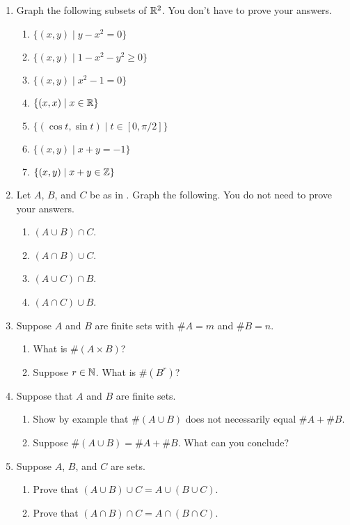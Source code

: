 \begin{enumerate}
    \item Graph the following subsets of $\mathbb{R}^2$. You don't have to prove your answers.
  \begin{enumerate}
      \item $\{(x, y) \mid y - x^2 = 0\}$
      \item $\{(x, y) \mid 1 - x^2 - y^2 \geq 0\}$
      \item $\{(x, y) \mid x^2 - 1 = 0\}$
      \item $\{(x, x) \mid x \in \mathbb{R}\}$
      \item $\{(\cos t, \sin t) \mid t \in [0, \pi/2]\}$
      \item $\{(x, y) \mid x + y = -1\}$
      \item $\{(x, y) \mid x + y \in \mathbb{Z}\}$
  \end{enumerate}

    \item Let $A$, $B$, and $C$ be as in . Graph the following. You do not need to prove your answers.
  \begin{enumerate}
      \item $(A \cup B) \cap C$.
      \item $(A \cap B) \cup C$.
      \item $(A \cup C) \cap B$.
      \item $(A \cap C) \cup B$.
  \end{enumerate}

    \item Suppose $A$ and $B$ are finite sets with $\# A = m$ and $\# B = n$.
  \begin{enumerate}
      \item What is $\# (A \times B)$?
      \item Suppose $r \in \mathbb{N}$. What is $\# (B^r)$?
  \end{enumerate}

    \item Suppose that $A$ and $B$ are finite sets.
  \begin{enumerate}
      \item Show by example that $\# (A \cup B)$ does not necessarily equal $\# A + \# B$.
      \item Suppose $\# (A \cup B) = \# A + \# B$. What can you conclude?
  \end{enumerate}

    \item Suppose $A$, $B$, and $C$ are sets.
  \begin{enumerate}
      \item Prove that $(A \cup B) \cup C = A \cup (B \cup C)$.
      \item Prove that $(A \cap B) \cap C = A \cap (B \cap C)$.
  \end{enumerate}


\end{enumerate}
